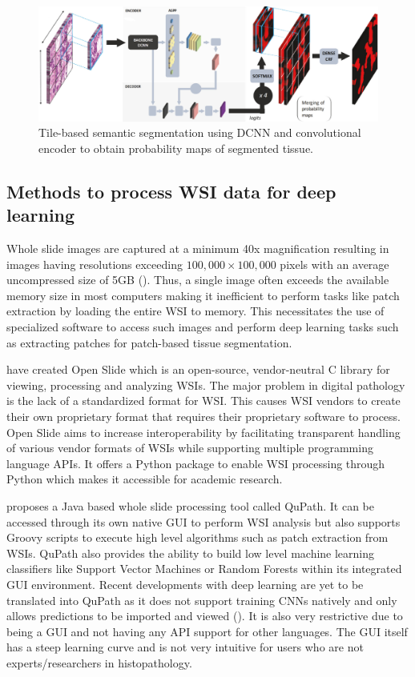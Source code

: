 \documentclass{l4proj}
\begin{document}
\begin{figure}[h]
    \centering
    \includegraphics[scale=0.4]{images/Priego-DCNN-encoder-arch.png}
    \caption{Tile-based semantic segmentation using DCNN and convolutional encoder to obtain probability maps of segmented tissue.}
    \label{fig:Priego-conv-pipeline}
\end{figure}

\subsection{Methods to process WSI data for deep learning} \label{background-openslide}
Whole slide images are captured at a minimum 40x magnification resulting in images having resolutions exceeding \(100,000 \times 100,000\) pixels with an average uncompressed size of 5GB (\cite{bandi2018detection}). Thus, a single image often exceeds the available memory size in most computers making it inefficient to perform tasks like patch extraction by loading the entire WSI to memory. This necessitates the use of specialized software to access such images and perform deep learning tasks such as extracting patches for patch-based tissue segmentation.

\cite{goode2013openslide} have created Open Slide which is an open-source, vendor-neutral C library for viewing, processing and analyzing WSIs. The major problem in digital pathology is the lack of a standardized format for WSI. This causes WSI vendors to create their own proprietary format that requires their proprietary software to process. Open Slide aims to increase interoperability by facilitating transparent handling of various vendor formats of WSIs while supporting multiple programming language APIs. It offers a Python package to enable WSI processing through Python which makes it accessible for academic research.  

\cite{bankhead2017qupath} proposes a Java based whole slide processing tool called QuPath. It can be accessed through its own native GUI to perform WSI analysis but also supports Groovy scripts to execute high level algorithms such as patch extraction from WSIs. QuPath also provides the ability to build low level machine learning classifiers like Support Vector Machines or Random Forests within its integrated GUI environment. Recent developments with deep learning are yet to be translated into QuPath as it does not support  training CNNs natively and only allows predictions to be imported and viewed (\cite{pedersen2021fastpathology}). It is also very restrictive due to being a GUI and not having any API support for other languages. The GUI itself has a steep learning curve and is not very intuitive for users who are not experts/researchers in histopathology. 
\end{document}
